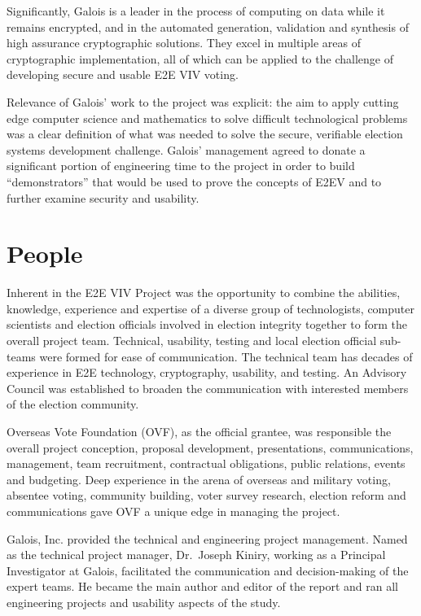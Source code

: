 Significantly, Galois is a leader in the process of computing on data
while it remains encrypted, and in the automated generation,
validation and synthesis of high assurance cryptographic
solutions. They excel in multiple areas of cryptographic
implementation, all of which can be applied to the challenge of
developing secure and usable E2E VIV voting.

Relevance of Galois’ work to the project was explicit: the aim to
apply cutting edge computer science and mathematics to solve difficult
technological problems was a clear definition of what was needed to
solve the secure, verifiable election systems development
challenge. Galois’ management agreed to donate a significant portion
of engineering time to the project in order to build “demonstrators”
that would be used to prove the concepts of E2EV and to further
examine security and usability.

\section{People}
\label{sec:people}

Inherent in the E2E VIV Project was the opportunity to combine the
abilities, knowledge, experience and expertise of a diverse group of
technologists, computer scientists and election officials involved in
election integrity together to form the overall project
team. Technical, usability, testing and local election official
sub-teams were formed for ease of communication. The technical team
has decades of experience in E2E technology, cryptography, usability,
and testing. An Advisory Council was established to broaden the
communication with interested members of the election community. 

Overseas Vote Foundation (OVF), as the official grantee, was
responsible the overall project conception, proposal development,
presentations, communications, management, team recruitment,
contractual obligations, public relations, events and budgeting. Deep
experience in the arena of overseas and military voting, absentee
voting, community building, voter survey research, election reform and
communications gave OVF a unique edge in managing the project. 

Galois, Inc. provided the technical and engineering project
management. Named as the technical project manager, Dr.~Joseph Kiniry,
working as a Principal Investigator at Galois, facilitated the
communication and decision-making of the expert teams. He became the
main author and editor of the report and ran all engineering projects
and usability aspects of the study.

